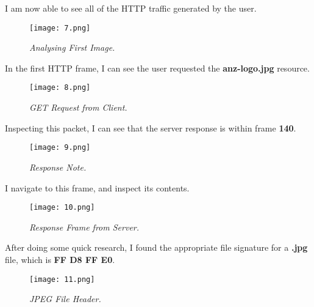 I am now able to see all of the HTTP traffic generated by the user.

\begin{figure}[H]
    \setlength{\abovecaptionskip}{20pt}
    \setlength{\belowcaptionskip}{0pt}
    \centering
    \texttt{[image: 7.png]}
    \captionsetup{justification=centering}
    \caption{\textit{Analysing First Image.}}
    \label{fig:7}
\end{figure}
\vspace{-10pt}

In the first HTTP frame, I can see the user requested the \textbf{anz-logo.jpg} resource. 

\begin{figure}[H]
    \setlength{\abovecaptionskip}{20pt}
    \setlength{\belowcaptionskip}{0pt}
    \centering
    \texttt{[image: 8.png]}
    \captionsetup{justification=centering}
    \caption{\textit{GET Request from Client.}}
    \label{fig:8}
\end{figure}
\vspace{-10pt}

Inspecting this packet, I can see that the server response is within frame \textbf{140}. 

\begin{figure}[H]
    \setlength{\abovecaptionskip}{20pt}
    \setlength{\belowcaptionskip}{0pt}
    \centering
    \texttt{[image: 9.png]}
    \captionsetup{justification=centering}
    \caption{\textit{Response Note.}}
    \label{fig:9}
\end{figure}
\vspace{-10pt}

I navigate to this frame, and inspect its contents.

\begin{figure}[H]
    \setlength{\abovecaptionskip}{20pt}
    \setlength{\belowcaptionskip}{0pt}
    \centering
    \texttt{[image: 10.png]}
    \captionsetup{justification=centering}
    \caption{\textit{Response Frame from Server.}}
    \label{fig:10}
\end{figure}
\vspace{-10pt}

After doing some quick research\cite{sig}, I found the appropriate file signature for a \textbf{.jpg} file, which is \textbf{FF D8 FF E0}.

\begin{figure}[H]
    \setlength{\abovecaptionskip}{20pt}
    \setlength{\belowcaptionskip}{0pt}
    \centering
    \texttt{[image: 11.png]}
    \captionsetup{justification=centering}
    \caption{\textit{JPEG File Header\cite{sig}.}}
    \label{fig:11}
\end{figure}
\vspace{-10pt}

